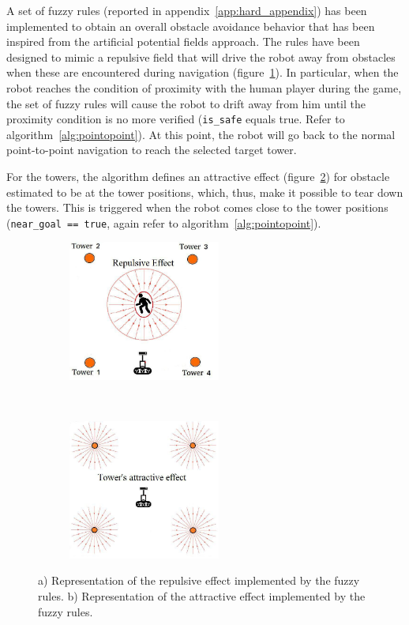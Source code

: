 A set of fuzzy rules (reported in appendix~\ref{app:hard_appendix})	has been implemented to obtain an overall obstacle avoidance behavior that has been inspired from the artificial potential fields approach. The rules have been designed to mimic a repulsive field that will drive the robot away from obstacles when these are encountered during navigation (figure~\ref{fig:avoid1}). In particular, when the robot reaches the condition of proximity with the human player during the game, the set of fuzzy rules will cause the robot to drift away from him until the proximity condition is no more verified (\verb|is_safe| equals true. Refer to algorithm~\ref{alg:pointopoint}). At this point, the robot will go back to the normal point-to-point navigation to reach the selected target tower.

For the towers, the algorithm defines an attractive effect (figure~\ref{fig:avoid2}) for obstacle estimated to be at the tower positions, which, thus, make it possible to tear down the towers. This is triggered when the robot comes close to the tower positions (\verb|near_goal == true|, again refer to algorithm~\ref{alg:pointopoint}). %

\begin{figure}[H]
	\centering
	\begin{subfigure}[b]{0.4\textwidth}
		\includegraphics[width=5cm]{images/03-foundation/avoid1}
		\caption{}
		\label{fig:avoid1} 
	\end{subfigure}
    ~
	\begin{subfigure}[b]{0.4\textwidth}
		\includegraphics[width=5cm]{images/03-foundation/avoid2}
		\caption{}
		\label{fig:avoid2}
	\end{subfigure}
	\caption{a) Representation of the repulsive effect implemented by the fuzzy rules. b) Representation of the attractive effect implemented by the fuzzy rules. }
	\label{rulesbehavior}
\end{figure}

